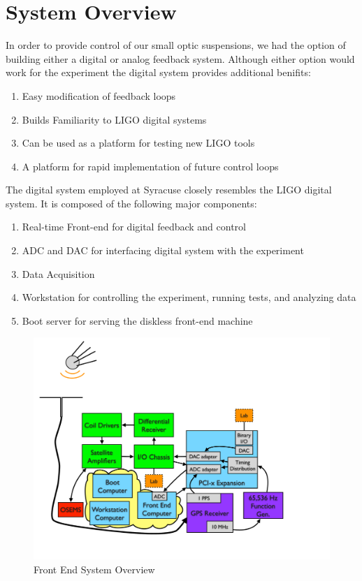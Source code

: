 
\section{System Overview}

In order to provide control of our small optic suspensions, we had the option of building either a digital or analog feedback system.
Although either option would work for the experiment the digital system provides additional benifits:

\begin{enumerate}
\item Easy modification of feedback loops
\item Builds Familiarity to LIGO digital systems
\item Can be used as a platform for testing new LIGO tools
\item A platform for rapid implementation of future control loops
\end{enumerate}

The digital system employed at Syracuse closely resembles the LIGO digital system. It is composed of the following major components:
\begin{enumerate}
\item Real-time Front-end for digital feedback and control
\item ADC and DAC for interfacing digital system with the experiment
\item Data Acquisition
\item Workstation for controlling the experiment, running tests, and analyzing data
\item Boot server for serving the diskless front-end machine
\end{enumerate}

\begin{figure}[htbp]
	\centering
		\includegraphics[width=15cm]{./figures/FrontEndSystem.pdf}
	\caption[Front End System Overview]{Front End System Overview}
	\label{fig:front_end}
\end{figure}

